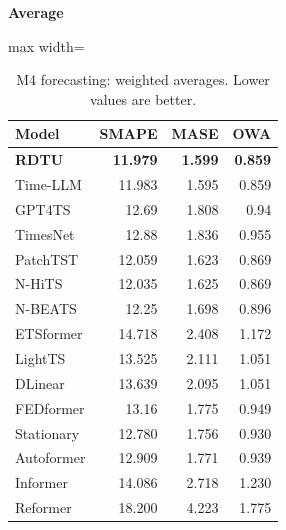 \begin{table}[H]\centering\small
\caption{M4 forecasting: weighted averages. Lower values are better.}\label{tab:short-term-forecasting-brief}
\textbf{Average}\par\smallskip
\begin{adjustbox}{max width=\linewidth}\begin{tabular}{lrrr}\toprule
\textbf{Model} & \textbf{SMAPE} & \textbf{MASE} & \textbf{OWA}\\\midrule
\rowcolor{blue!5}
\textbf{RDTU} & \textbf{11.979} & \textbf{1.599} & \textbf{0.859}\\
Time-LLM & 11.983 & 1.595 & 0.859\\
GPT4TS & 12.69 & 1.808 & 0.94\\
TimesNet & 12.88 & 1.836 & 0.955\\
PatchTST & 12.059 & 1.623 & 0.869\\
N-HiTS & 12.035 & 1.625 & 0.869\\
N-BEATS & 12.25 & 1.698 & 0.896\\
ETSformer & 14.718 & 2.408 & 1.172\\
LightTS & 13.525 & 2.111 & 1.051\\
DLinear & 13.639 & 2.095 & 1.051\\
FEDformer & 13.16 & 1.775 & 0.949\\
Stationary & 12.780 & 1.756 & 0.930\\
Autoformer & 12.909 & 1.771 & 0.939\\
Informer & 14.086 & 2.718 & 1.230\\
Reformer & 18.200 & 4.223 & 1.775\\
\bottomrule\end{tabular}\end{adjustbox}\end{table}
